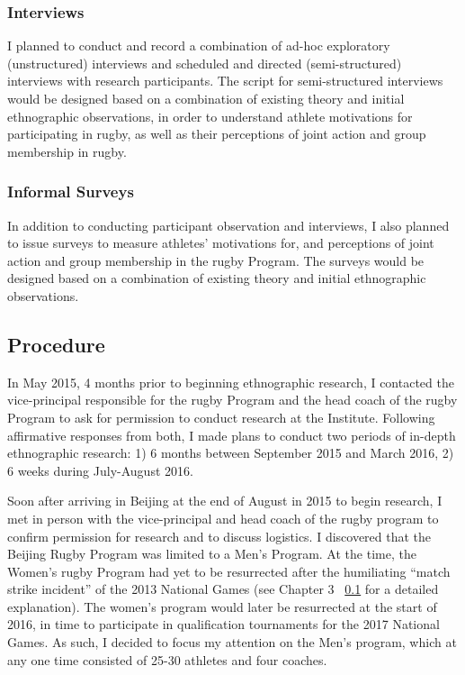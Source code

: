   \subsubsection{Interviews}
  I planned to conduct and record a combination of ad-hoc exploratory (unstructured) interviews and scheduled and directed (semi-structured) interviews with research participants.  The script for semi-structured interviews would be designed based on a combination of existing theory and initial ethnographic observations, in order to  understand athlete motivations for participating in rugby, as well as their perceptions of joint action and group membership in rugby.

  \subsubsection{Informal Surveys}
  In addition to conducting participant observation and interviews, I also planned to issue surveys to measure athletes' motivations for, and perceptions of joint action and group membership in the rugby Program.  The surveys would be designed based on a combination of existing theory and initial ethnographic observations.


\subsection{Procedure}

In May 2015, 4 months prior to beginning ethnographic research, I contacted the vice-principal responsible for the rugby Program and the head coach of the rugby Program to ask for permission to conduct research at the Institute.  Following affirmative responses from both, I made plans to conduct two periods of in-depth ethnographic research: 1) 6 months between September 2015 and March 2016, 2) 6 weeks during July-August 2016.

Soon after arriving in Beijing at the end of August in 2015 to begin research, I met in person with the vice-principal and head coach of the rugby program to confirm permission for research and to discuss logistics.  I discovered that the Beijing Rugby Program was limited to a Men's Program.  At the time, the Women's rugby Program had yet to be resurrected after the humiliating ``match strike incident'' of the 2013 National Games (see Chapter 3 ~\ref{} for a detailed explanation). The women's program would later be resurrected at the start of 2016, in time to participate in qualification tournaments for the 2017 National Games.  As such, I decided to focus my attention on the Men's program, which at any one time consisted of 25-30 athletes and four coaches.

